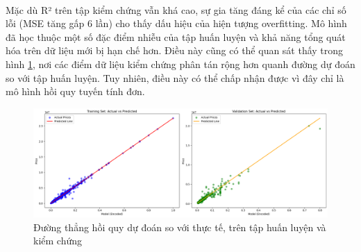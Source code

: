 \paragraph{}{Mặc dù R² trên tập kiểm chứng vẫn khá cao, sự gia tăng đáng kể của các chỉ số lỗi (MSE tăng gấp 6 lần) cho thấy dấu hiệu của hiện tượng overfitting. Mô hình đã học thuộc một số đặc điểm nhiễu của tập huấn luyện và khả năng tổng quát hóa trên dữ liệu mới bị hạn chế hơn. Điều này cũng có thể quan sát thấy trong hình \ref{fig:simple-linear}, nơi các điểm dữ liệu kiểm chứng phân tán rộng hơn quanh đường dự đoán so với tập huấn luyện. Tuy nhiên, điều này có thể  chấp nhận được vì đây chỉ là mô hình hồi quy tuyến tính đơn.}

\begin{figure}[H]
    \centering
    \includegraphics[width=1\linewidth]{img/simple-linear.png}
    \caption{Đường thẳng hồi quy dự đoán so với thực tế, trên tập huấn luyện và kiểm chứng}
    \label{fig:simple-linear}
\end{figure}

\pagebreak